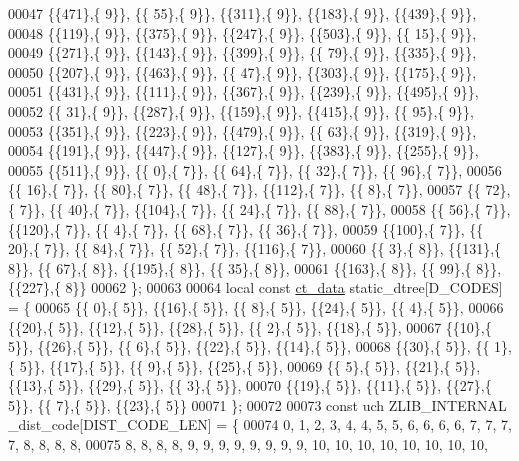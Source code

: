 \begin{DoxyCode}
00047 \{\{471\},\{  9\}\}, \{\{ 55\},\{  9\}\}, \{\{311\},\{  9\}\}, \{\{183\},\{  9\}\}, \{\{439\},\{  9\}\},
00048 \{\{119\},\{  9\}\}, \{\{375\},\{  9\}\}, \{\{247\},\{  9\}\}, \{\{503\},\{  9\}\}, \{\{ 15\},\{  9\}\},
00049 \{\{271\},\{  9\}\}, \{\{143\},\{  9\}\}, \{\{399\},\{  9\}\}, \{\{ 79\},\{  9\}\}, \{\{335\},\{  9\}\},
00050 \{\{207\},\{  9\}\}, \{\{463\},\{  9\}\}, \{\{ 47\},\{  9\}\}, \{\{303\},\{  9\}\}, \{\{175\},\{  9\}\},
00051 \{\{431\},\{  9\}\}, \{\{111\},\{  9\}\}, \{\{367\},\{  9\}\}, \{\{239\},\{  9\}\}, \{\{495\},\{  9\}\},
00052 \{\{ 31\},\{  9\}\}, \{\{287\},\{  9\}\}, \{\{159\},\{  9\}\}, \{\{415\},\{  9\}\}, \{\{ 95\},\{  9\}\},
00053 \{\{351\},\{  9\}\}, \{\{223\},\{  9\}\}, \{\{479\},\{  9\}\}, \{\{ 63\},\{  9\}\}, \{\{319\},\{  9\}\},
00054 \{\{191\},\{  9\}\}, \{\{447\},\{  9\}\}, \{\{127\},\{  9\}\}, \{\{383\},\{  9\}\}, \{\{255\},\{  9\}\},
00055 \{\{511\},\{  9\}\}, \{\{  0\},\{  7\}\}, \{\{ 64\},\{  7\}\}, \{\{ 32\},\{  7\}\}, \{\{ 96\},\{  7\}\},
00056 \{\{ 16\},\{  7\}\}, \{\{ 80\},\{  7\}\}, \{\{ 48\},\{  7\}\}, \{\{112\},\{  7\}\}, \{\{  8\},\{  7\}\},
00057 \{\{ 72\},\{  7\}\}, \{\{ 40\},\{  7\}\}, \{\{104\},\{  7\}\}, \{\{ 24\},\{  7\}\}, \{\{ 88\},\{  7\}\},
00058 \{\{ 56\},\{  7\}\}, \{\{120\},\{  7\}\}, \{\{  4\},\{  7\}\}, \{\{ 68\},\{  7\}\}, \{\{ 36\},\{  7\}\},
00059 \{\{100\},\{  7\}\}, \{\{ 20\},\{  7\}\}, \{\{ 84\},\{  7\}\}, \{\{ 52\},\{  7\}\}, \{\{116\},\{  7\}\},
00060 \{\{  3\},\{  8\}\}, \{\{131\},\{  8\}\}, \{\{ 67\},\{  8\}\}, \{\{195\},\{  8\}\}, \{\{ 35\},\{  8\}\},
00061 \{\{163\},\{  8\}\}, \{\{ 99\},\{  8\}\}, \{\{227\},\{  8\}\}
00062 \};
00063 
00064 local \textcolor{keyword}{const} \hyperlink{structct__data__s}{ct\_data} static\_dtree[D\_CODES] = \{
00065 \{\{ 0\},\{ 5\}\}, \{\{16\},\{ 5\}\}, \{\{ 8\},\{ 5\}\}, \{\{24\},\{ 5\}\}, \{\{ 4\},\{ 5\}\},
00066 \{\{20\},\{ 5\}\}, \{\{12\},\{ 5\}\}, \{\{28\},\{ 5\}\}, \{\{ 2\},\{ 5\}\}, \{\{18\},\{ 5\}\},
00067 \{\{10\},\{ 5\}\}, \{\{26\},\{ 5\}\}, \{\{ 6\},\{ 5\}\}, \{\{22\},\{ 5\}\}, \{\{14\},\{ 5\}\},
00068 \{\{30\},\{ 5\}\}, \{\{ 1\},\{ 5\}\}, \{\{17\},\{ 5\}\}, \{\{ 9\},\{ 5\}\}, \{\{25\},\{ 5\}\},
00069 \{\{ 5\},\{ 5\}\}, \{\{21\},\{ 5\}\}, \{\{13\},\{ 5\}\}, \{\{29\},\{ 5\}\}, \{\{ 3\},\{ 5\}\},
00070 \{\{19\},\{ 5\}\}, \{\{11\},\{ 5\}\}, \{\{27\},\{ 5\}\}, \{\{ 7\},\{ 5\}\}, \{\{23\},\{ 5\}\}
00071 \};
00072 
00073 \textcolor{keyword}{const} uch ZLIB\_INTERNAL \_dist\_code[DIST\_CODE\_LEN] = \{
00074  0,  1,  2,  3,  4,  4,  5,  5,  6,  6,  6,  6,  7,  7,  7,  7,  8,  8,  8,  8,
00075  8,  8,  8,  8,  9,  9,  9,  9,  9,  9,  9,  9, 10, 10, 10, 10, 10, 10, 10, 10,

\end{DoxyCode}
